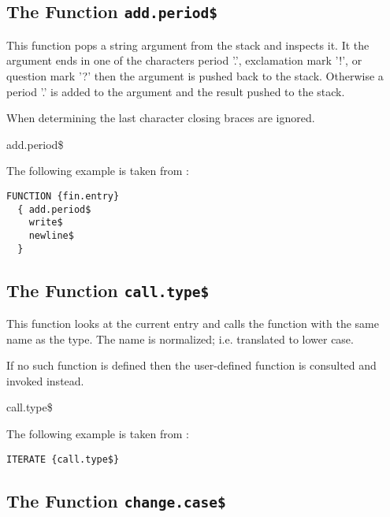 \subsection{The Function \texttt{add.period\$}}%

This function pops a string argument from the stack and inspects it.
It the argument ends in one of the characters period '.', exclamation
mark '!', or question mark '?' then the argument is pushed back to the
stack. Otherwise a period '.' is added to the argument and the result
pushed to the stack.

When determining the last character closing braces are ignored.

\begin{BstFunction}{add.period\$}
\end{BstFunction}

The following example is taken from :

\begin{lstlisting}[language=bst]
  FUNCTION {fin.entry}
  { add.period$
    write$
    newline$
  }
\end{lstlisting}


\subsection{The Function \texttt{call.type\$}}%

This function looks at the current entry and calls the function
with the same name as the type. The name is normalized; i.e.
translated to lower case.

If no such function is defined then the user-defined function
 is consulted and invoked instead.

\begin{BstFunction}{call.type\$}
\end{BstFunction}

The following example is taken from :

\begin{lstlisting}[language=bst]
  ITERATE {call.type$}
\end{lstlisting}


\subsection{The Function \texttt{change.case\$}}%

